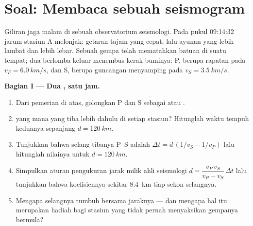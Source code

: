 \section{Soal: Membaca sebuah seismogram}

\begin{problem}
\label{pb:g12:mechanical-waves:1}
Giliran jaga malam di sebuah observatorium seismologi. Pada pukul
09:14:32 jarum stasiun A melonjak: getaran tajam yang cepat, lalu ayunan
yang lebih lambat dan lebih lebar. Sebuah gempa telah mematahkan batuan
di suatu tempat; dua  berlomba keluar menembus kerak buminya:
 P, berupa rapatan pada $v_P = \qty{6.0}{km/s}$, dan 
S, berupa guncangan menyamping pada $v_S = \qty{3.5}{km/s}$.

\medskip
\noindent\textbf{Bagian I --- Dua , satu jam.}
\begin{enumerate}
  \item Dari pemerian di atas, golongkan  P dan S sebagai
         atau .
  \item {} yang mana yang tiba lebih dahulu di setiap stasiun?
        Hitunglah waktu tempuh keduanya sepanjang $d = \qty{120}{km}$.
  \item Tunjukkan bahwa selang tibanya P--S adalah
        $\Delta t = d\,(1/v_S - 1/v_P)$ lalu hitunglah nilainya untuk
        $d = \qty{120}{km}$.
  \item Simpulkan aturan pengukuran jarak milik ahli seismologi
        $d = \dfrac{v_P\,v_S}{v_P - v_S}\,\Delta t$ lalu tunjukkan bahwa
        koefisiennya sekitar \qty{8.4}{km} tiap sekon selangnya.
  \item Mengapa selangnya tumbuh bersama jaraknya --- dan mengapa hal
        itu merupakan hadiah bagi stasiun yang tidak pernah menyaksikan
        gempanya bermula?
\end{enumerate}


\end{problem}
